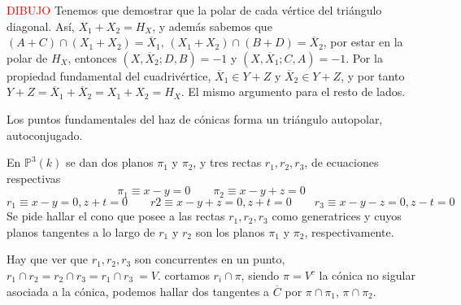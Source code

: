 \begin{sol}
    \textcolor{red}{DIBUJO}
    Tenemos que demostrar que la polar de cada v\'ertice del tri\'angulo diagonal. As\'i, $X_1+X_2=H_X$, y adem\'as sabemos que $(A+C)\cap (X_1+X_2)=\overline{X}_1, \, (X_1+X_2) \cap (B+D)= \overline{X}_2$, por estar en la polar de $H_X$, entonces $(X,\overline{X}_2;D,B)=-1$ y $(X,\overline{X}_1;C,A)=-1$. Por la propiedad fundamental del cuadriv\'ertice, $\overline{X}_1\in Y+Z$ y $\overline{X}_2 \in Y+Z$, y por tanto $Y+Z=\overline{X}_1+\overline{X}_2 = X_1+X_2=H_X$. El mismo argumento para el resto de lados. 
\end{sol}
\begin{cor}
    Los puntos fundamentales del haz de c\'onicas forma un tri\'angulo autopolar, autoconjugado.
\end{cor}
\begin{ejer}
    [19] En $\mathbb P^3(k)$ se dan dos planos $\pi_1$ y $\pi_2$, y tres rectas $r_1, r_2, r_3$, de ecuaciones respectivas
    $$\pi_1 \equiv x - y = 0 \qquad \pi_2 \equiv x - y + z = 0 $$
    $$r_1 \equiv x - y = 0, z + t = 0\qquad r2 \equiv x - y + z = 0, z + t = 0 \qquad  r_3 \equiv x - y - z = 0, z - t = 0$$
Se pide hallar el cono que posee a las rectas $r_1, r_2, r_3$ como generatrices y cuyos planos
tangentes a lo largo de $r_1$ y $r_2$ son los planos $\pi_1$ y $\pi_2$, respectivamente.
\end{ejer}
\begin{sol}
    Hay que ver que $r_1,r_2,r_3$ son concurrentes en un punto, $r_1\cap r_2=r_2\cap r_3= r_1\cap r_3\ = V$. cortamos $r_i \cap \pi$, siendo $\pi=V^c$ la c\'onica no sigular asociada a la c\'onica, podemos hallar dos tangentes a $\overline{C}$ por $\pi \cap \pi_1$, $\pi \cap \pi_2$.  
\end{sol}
